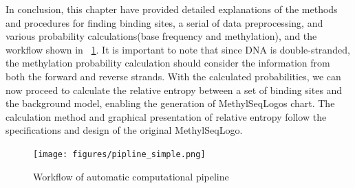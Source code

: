 \documentclass{PHlab-thesis}
\begin{document}
\begin{table}[H]
	\centering
	\caption{Detailed information about the WGBS files from the ENCODE}
	\label{table:WGBSinfo}
\end{table}
In conclusion, this chapter have provided detailed explanations of the methods and procedures for finding binding sites, a serial of  data preprocessing, and various probability calculations(base frequency and methylation), and the workflow shown in ~\ref{fig:Automatipipeline}. It is important to note that since DNA is double-stranded, the methylation probability calculation should consider the information from both the forward and reverse strands. With the calculated probabilities, we can now proceed to calculate the relative entropy between a set of binding sites and the background model, enabling the generation of MethylSeqLogos chart. The calculation method and graphical presentation of relative entropy follow the specifications and design of the original MethylSeqLogo.
\clearpage
\begin{figure}
	\centering
	\texttt{[image: figures/pipline\_simple.png]}
	\caption{Workflow of automatic computational pipeline}
	\label{fig:Automatipipeline} 
\end{figure}
\end{document}
